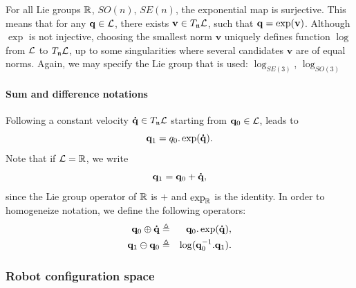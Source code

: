For all Lie groups $\mathbb{R}$, $SO(n)$, $SE(n)$, the exponential map is surjective. This means that for any $\mathbf{q}\in\mathcal{L}$, there exists $\mathbf{v}\in T_{\mathfrak{n}}\mathcal{L}$, such that $\mathbf{q} = \exp(\mathbf{v})$.
Although $\exp$ is not injective, choosing the smallest norm $\mathbf{v}$ uniquely defines function $\log$ from $\mathcal{L}$ to $T_{\mathfrak{n}}\mathcal{L}$, up to some singularities where several candidates $\mathbf{v}$ are of equal norms.
Again, we may specify the Lie group that is used: \href{https://github.com/stack-of-tasks/pinocchio/blob/f8f3b9a24eab527df79650e3dc73410f9a46a2b2/src/spatial/log.hxx#L112}{$\log_{SE(3)}$}, \href{https://github.com/stack-of-tasks/pinocchio/blob/f8f3b9a24eab527df79650e3dc73410f9a46a2b2/src/spatial/log.hxx#L15}{$\log_{SO(3)}$}

\paragraph{Sum and difference notations}

Following a constant velocity $\mathbf{\dot{q}}\in T_{\mathfrak{n}}\mathcal{L}$ starting from $\mathbf{q}_0\in\mathcal{L}$, leads to
$$
\mathbf{q}_1 = q_0.\exp(\mathbf{\dot{q}}).
$$
Note that if $\mathcal{L}=\mathbb{R}$, we write
$$
\mathbf{q}_1 = \mathbf{q}_0 + \mathbf{\dot{q}},
$$
since the Lie group operator of $\mathbb{R}$ is $+$ and $\exp_{\mathbb{R}}$ is the identity.
In order to homogeneize notation, we define the following operators:
\begin{eqnarray}\label{eq:plus}
  \conf_0 \oplus \dconf &\triangleq& \conf_0.\exp(\dconf),\\
  \label{eq:minus}
  \conf_1 \ominus \conf_0 &\triangleq& \log(\conf_0^{-1}.\conf_1).
\end{eqnarray}

\subsubsection{Robot configuration space}

